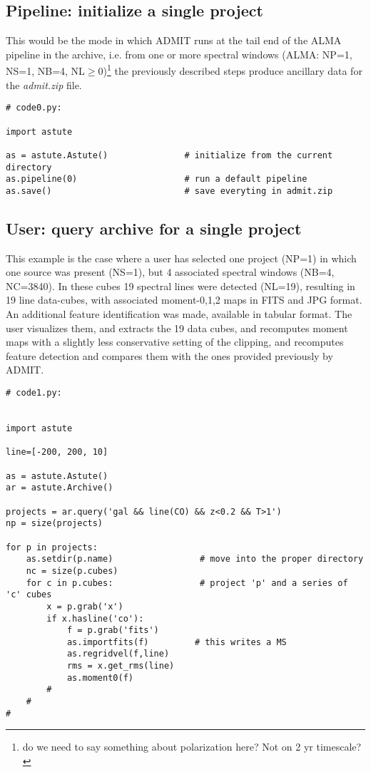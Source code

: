 \documentclass[preprint]{aastex} %
\begin{document}
\subsection{Pipeline: initialize a single project}

This would be the mode in which ADMIT runs at the tail end of the ALMA pipeline
in the archive, i.e. from one or more spectral
windows (ALMA: NP=1, NS=1, NB=4, NL$\ge$0)\footnote{do we need to say something about 
polarization here? Not on 2 yr timescale?} 
the previously described steps produce ancillary data for the
{\it admit.zip} file.

\footnotesize
\begin{verbatim}
# code0.py:

import astute

as = astute.Astute()               # initialize from the current directory
as.pipeline(0)                     # run a default pipeline
as.save()                          # save everyting in admit.zip

\end{verbatim}
\normalsize


\subsection{User: query archive for a single project}

This example is the case where a user has selected one project (NP=1)
in which one source was present (NS=1), but 4 associated 
spectral windows (NB=4, NC=3840). In these cubes 19 spectral lines 
were detected (NL=19),
resulting in 19 line data-cubes, with associated moment-0,1,2 maps in FITS
and JPG format. An additional feature identification was made, available
in tabular format.  The user visualizes them, and extracts the 19
data cubes, and recomputes moment maps with a slightly less conservative
setting of the clipping, and recomputes feature detection and compares
them with the ones provided previously by ADMIT.

\footnotesize
\begin{verbatim}
# code1.py:


import astute

line=[-200, 200, 10]

as = astute.Astute()
ar = astute.Archive()

projects = ar.query('gal && line(CO) && z<0.2 && T>1')
np = size(projects)

for p in projects:
    as.setdir(p.name)                 # move into the proper directory
    nc = size(p.cubes)
    for c in p.cubes:                 # project 'p' and a series of 'c' cubes
        x = p.grab('x')
        if x.hasline('co'):
            f = p.grab('fits')
            as.importfits(f)         # this writes a MS
            as.regridvel(f,line)
            rms = x.get_rms(line)
            as.moment0(f)
        #
    #
#

\end{verbatim}
\normalsize
\end{document}
